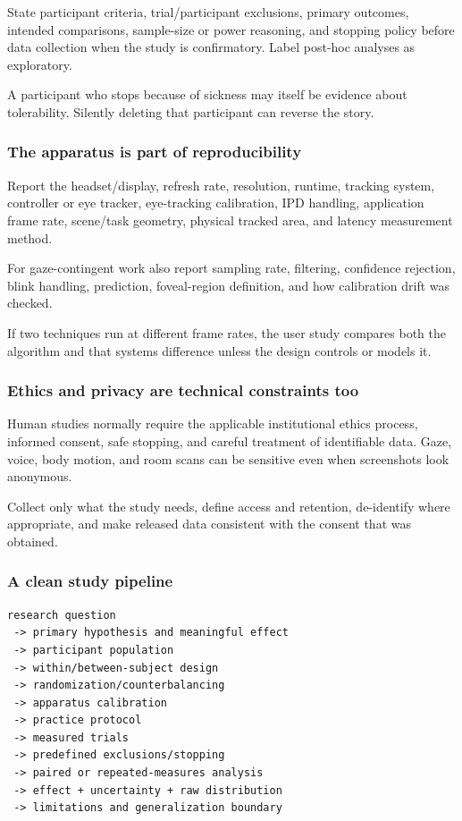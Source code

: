 State participant criteria, trial/participant exclusions, primary outcomes, intended comparisons, sample-size or power reasoning, and stopping policy before data collection when the study is confirmatory. Label post-hoc analyses as exploratory.

A participant who stops because of sickness may itself be evidence about tolerability. Silently deleting that participant can reverse the story.

\subsubsection{The apparatus is part of reproducibility}\label{the-apparatus-is-part-of-reproducibility}

Report the headset/display, refresh rate, resolution, runtime, tracking system, controller or eye tracker, eye-tracking calibration, IPD handling, application frame rate, scene/task geometry, physical tracked area, and latency measurement method.

For gaze-contingent work also report sampling rate, filtering, confidence rejection, blink handling, prediction, foveal-region definition, and how calibration drift was checked.

If two techniques run at different frame rates, the user study compares both the algorithm and that systems difference unless the design controls or models it.

\subsubsection{Ethics and privacy are technical constraints too}\label{ethics-and-privacy-are-technical-constraints-too}

Human studies normally require the applicable institutional ethics process, informed consent, safe stopping, and careful treatment of identifiable data. Gaze, voice, body motion, and room scans can be sensitive even when screenshots look anonymous.

Collect only what the study needs, define access and retention, de-identify where appropriate, and make released data consistent with the consent that was obtained.

\subsubsection{A clean study pipeline}\label{a-clean-study-pipeline}

\begin{verbatim}
research question
 -> primary hypothesis and meaningful effect
 -> participant population
 -> within/between-subject design
 -> randomization/counterbalancing
 -> apparatus calibration
 -> practice protocol
 -> measured trials
 -> predefined exclusions/stopping
 -> paired or repeated-measures analysis
 -> effect + uncertainty + raw distribution
 -> limitations and generalization boundary
\end{verbatim}

